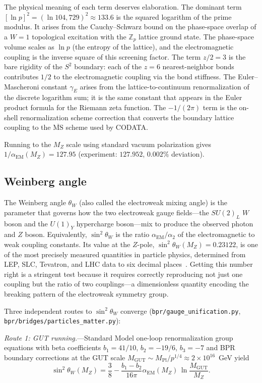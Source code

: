 \documentclass[aps,prd,twocolumn,superscriptaddress,longbibliography,nofootinbib]{revtex4-2}
\newcommand{\Zp}{\mathbb{Z}_p}
\newcommand{\Stwo}{S^2}
\newcommand{\sinW}{\sin^2\!\theta_W}
\newcommand{\alphaEM}{\alpha_{\mathrm{EM}}}
\newcommand{\MPl}{M_{\mathrm{Pl}}}
\newcommand{\MGUT}{M_{\mathrm{GUT}}}
\newcommand{\MZ}{M_Z}
\begin{document}
The physical meaning of each term deserves elaboration.
The dominant term $[\ln p]^2 = (\ln 104{,}729)^2 \approx 133.6$
is the squared logarithm of the prime modulus.  It arises from the
Cauchy--Schwarz bound on the phase-space overlap of a $W = 1$
topological excitation with the $\Zp$ lattice ground state.
The phase-space volume scales as $\ln p$ (the entropy of the lattice),
and the electromagnetic coupling is the inverse square of this
screening factor.  The term $z/2 = 3$ is the bare rigidity of the
$\Stwo$ boundary: each of the $z = 6$ nearest-neighbor bonds
contributes $1/2$ to the electromagnetic coupling via the bond stiffness.
The Euler--Mascheroni constant $\gamma_E$ arises from the
lattice-to-continuum renormalization of the discrete logarithm sum;
it is the same constant that appears in the Euler product formula for
the Riemann zeta function.  The $-1/(2\pi)$ term is the on-shell
renormalization scheme correction that converts the boundary
lattice coupling to the $\overline{\mathrm{MS}}$ scheme used by
CODATA.

Running to the $\MZ$ scale using standard vacuum polarization gives
$1/\alphaEM(\MZ) = 127.95$ (experiment: $127.952$, $0.002\%$
deviation).

\subsection{Weinberg angle}

The Weinberg angle $\theta_W$ (also called the electroweak mixing
angle) is the parameter that governs how the two electroweak gauge
fields---the $SU(2)_L$ $W$ boson and the $U(1)_Y$ hypercharge
boson---mix to produce the observed photon and $Z$ boson.
Equivalently, $\sin^2\theta_W$ is the ratio $\alpha_{\mathrm{EM}} /
\alpha_2$ of the electromagnetic to weak coupling constants.  Its
value at the $Z$-pole, $\sinW(M_Z) = 0.23122$, is one of the most
precisely measured quantities in particle physics, determined from
LEP, SLC, Tevatron, and LHC data to six decimal
places~\cite{PDG2024}.  Getting this number right is a stringent test
because it requires correctly reproducing not just one coupling but
the ratio of two couplings---a dimensionless quantity encoding the
breaking pattern of the electroweak symmetry group.

Three independent routes to $\sinW$ converge
(\texttt{bpr/gauge\_unification.py},
\texttt{bpr/bridges/particles\_matter.py}):

\textit{Route 1: GUT running.}---Standard Model one-loop
renormalization group equations with beta coefficients
$b_1 = 41/10$, $b_2 = -19/6$, $b_3 = -7$ and BPR boundary
corrections at the GUT scale $\MGUT \sim \MPl / p^{1/4} \approx
2 \times 10^{16}$~GeV yield
\begin{equation}
\sinW(\MZ) = \frac{3}{8} - \frac{b_1 - b_2}{16\pi}
  \alphaEM(\MZ)\, \ln\frac{\MGUT}{\MZ}.
\label{eq:weinberg_running}
\end{equation}
\end{document}
